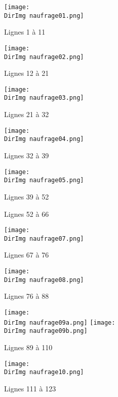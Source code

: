 \documentclass[a4paper,10pt]{article}
\newcommand{\DirImg}{../img/Naufrage/}
\begin{document}

\begin{figure}[!h]
  \centering
  \texttt{[image: \\DirImg naufrage01.png]}
  \caption{Lignes 1 à 11}
  \label{img01}
\end{figure}

\begin{figure}[!h]
  \centering
  \texttt{[image: \\DirImg naufrage02.png]}
  \caption{Lignes 12 à 21}
  \label{img02}
\end{figure}


\begin{figure}[!h]
  \centering
  \texttt{[image: \\DirImg naufrage03.png]}
  \caption{Lignes 21 à 32}
  \label{img03}
\end{figure}


\begin{figure}[!h]
  \centering
  \texttt{[image: \\DirImg naufrage04.png]}
  \caption{Lignes 32 à 39}
  \label{img04}
\end{figure}


\begin{figure}[!h]
  \centering
  \texttt{[image: \\DirImg naufrage05.png]}
  \caption{Lignes 39 à 52}
  \label{img05}
\end{figure}


\begin{figure}[!h]
  \centering
  \caption{Lignes 52 à 66}
  \label{img06}
\end{figure}


\begin{figure}[!h]
  \centering
  \texttt{[image: \\DirImg naufrage07.png]}
  \caption{Lignes 67 à 76}
  \label{img07}
\end{figure}


\begin{figure}[!h]
  \centering
  \texttt{[image: \\DirImg naufrage08.png]}
  \caption{Lignes 76 à 88}
  \label{img08}
\end{figure}


\begin{figure}[!h]
  \centering
  \texttt{[image: \\DirImg naufrage09a.png]}
  \texttt{[image: \\DirImg naufrage09b.png]}
  \caption{Lignes 89 à 110}
  \label{img09}
\end{figure}


\begin{figure}[!h]
  \centering
  \texttt{[image: \\DirImg naufrage10.png]}
  \caption{Lignes 111 à 123}
  \label{img10}
\end{figure}
\end{document}

